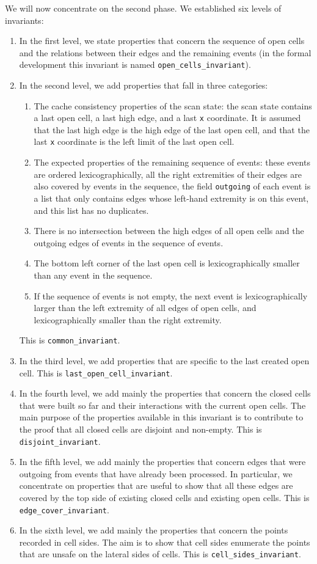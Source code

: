 \documentclass[a4paper, USenglish, cleveref, autoref, thm-restate, final]{lipics-v2021}
\begin{document}
We will now concentrate on the second phase.
We established six levels of invariants:
\begin{enumerate}
\item In the first level, we state properties that concern the
sequence of open cells and the relations between their edges and the remaining
events (in the formal development this invariant is named
{\tt open\_cells\_invariant}).
\item In the second level, we add properties that fall in three categories:
  \begin{enumerate}
    \item The cache consistency properties of
  the scan state: the scan state contains a last open cell, a last high edge,
  and a last {\tt x} coordinate.  It is assumed that the last high edge
  is the high edge of the last open cell, and that the last {\tt x} coordinate
  is the left limit of the last open cell.
\item The expected properties of the remaining sequence of events: these
  events are ordered lexicographically, all the right extremities of their
  edges are also covered by events in the sequence, the field {\tt outgoing}
  of each event is a list that only contains edges whose left-hand extremity
  is on this event, and this list has no duplicates.
\item There is no intersection between the high edges of all open cells
  and the outgoing edges of events in the sequence of events.
\item The bottom left corner of the last open cell is lexicographically
  smaller than any event in the sequence.
\item If the sequence of events is not empty, the next event is
  lexicographically larger than the left extremity of all edges of
  open cells, and lexicographically smaller than the right extremity.
\end{enumerate}
This is {\tt common\_invariant}.
\item In the third level, we add properties that are specific to the
  last created open cell. This is {\tt last\_open\_cell\_invariant}.
\item In the fourth level, we add mainly the properties that concern
  the closed cells that were built so far and their interactions with
  the current open cells.  The main purpose of the properties
  available in this invariant is to contribute to the proof that
  all closed cells are disjoint and non-empty. This is
{\tt disjoint\_invariant}.
\item In the fifth level, we add mainly the properties that concern
  edges that were outgoing from events that have already been processed.
  In particular, we concentrate on properties that are useful to show that
  all these edges are covered by the top side of existing closed cells and
  existing open cells.  This is {\tt edge\_cover\_invariant}.
\item In the sixth level, we add mainly the properties that concern
  the points recorded in cell sides.  The aim is to show that cell
  sides enumerate the points that are unsafe on the lateral
  sides of cells.  This is {\tt cell\_sides\_invariant}.
\end{enumerate}
\end{document}
